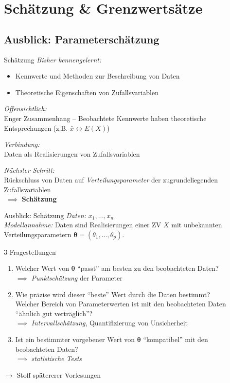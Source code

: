 \documentclass[
  10pt,
  ignorenonframetext,
]{beamer}
\providecommand{\tightlist}{%
  \setlength{\itemsep}{0pt}\setlength{\parskip}{0pt}}
\begin{document}
\section{Schätzung \&
Grenzwertsätze}\label{schuxe4tzung-grenzwertsuxe4tze}

\subsection{Ausblick:
Parameterschätzung}\label{ausblick-parameterschuxe4tzung}

\begin{frame}{Schätzung}
\label{schuxe4tzung}
\emph{Bisher kennengelernt:}

\begin{itemize}
\tightlist
\item
  Kennwerte und Methoden zur Beschreibung von Daten
\item
  Theoretische Eigenschaften von Zufallsvariablen
\end{itemize}

\emph{Offensichtlich:}\\
Enger Zusammenhang -- Beobachtete Kennwerte haben theoretische
Entsprechungen (z.B. \(\bar x \leftrightarrow E(X)\))

\emph{Verbindung:}\\
Daten als Realisierungen von Zufallsvariablen

\emph{Nächster Schritt:}\\
Rückschluss von Daten auf \emph{Verteilungsparameter} der
zugrundeliegenden Zufallsvariablen\\
\(\; \implies\) \textbf{Schätzung}
\end{frame}

\begin{frame}{Ausblick: Schätzung}
\label{ausblick-schuxe4tzung}
\emph{Daten:} \(x_1, \dots, x_n\)\\
\emph{Modellannahme:} Daten sind Realisierungen einer ZV \(X\) mit
unbekannten Verteilungsparametern
\(\symbf{\theta} = (\theta_1, \dots, \theta_p)\).

3 Fragestellungen

\begin{enumerate}
\tightlist
\item
  Welcher Wert von \(\symbf{\theta}\) ``passt'' am besten zu den
  beobachteten Daten?\\
  \(\implies\) \emph{Punktschätzung} der Parameter
\item
  Wie präzise wird dieser ``beste'' Wert durch die Daten bestimmt?\\
  Welcher Bereich von Parameterwerten ist mit den beobachteten Daten
  ``ähnlich gut verträglich''?\\
  \(\implies\) \emph{Intervallschätzung}, Quantifizierung von
  Unsicherheit
\item
  Ist ein bestimmter vorgebener Wert von \(\symbf{\theta}\)
  ``kompatibel'' mit den beobachteten Daten?\\
  \(\implies\) \emph{statistische Tests}
\end{enumerate}

\(\rightarrow\) Stoff spätererer Vorlesungen
\end{frame}
\end{document}
